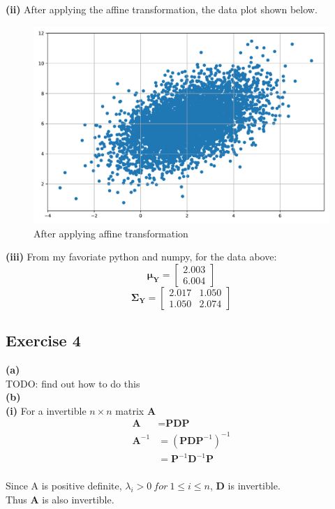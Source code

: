 \documentclass[11pt]{article}
\begin{document}
\textbf{(ii)} After applying the affine transformation, the data plot shown below.
\begin{figure}[h]
\centering
\includegraphics[width=0.45\linewidth]{exercise3_c2}
\caption{After applying affine transformation}
\label{fig: figure 3.3}
\end{figure}

\textbf{(iii)} From my favoriate python and numpy, for the data above:
$$\pmb{\mu}_\textbf{Y}=\begin{bmatrix}
2.003\\
6.004
\end{bmatrix}$$
$$\pmb{\Sigma}_\textbf{Y}=\begin{bmatrix}
2.017& 1.050\\
1.050& 2.074
\end{bmatrix}$$
\pagebreak
\subsection*{Exercise 4}
\noindent\textbf{(a)}\\
TODO: find out how to do this\\

\noindent\textbf{(b)}\\

\textbf{(i)}
For a invertible $n\times n$ matrix \textbf{A}\\
\begin{equation} \label{eq6}
\begin{split}
\textbf{A}&=\textbf{PDP}\\
\textbf{A}^{-1}&=(\textbf{PDP}^{-1})^{-1}\\
&=\textbf{P}^{-1}\textbf{D}^{-1}\textbf{P}\\
\end{split}
\end{equation}

Since A is positive definite, $\lambda_i > 0\ for\ 1\le i\le n$, $\textbf{D}$ is invertible.\\

Thus \textbf{A} is also invertible.\\
\end{document}
